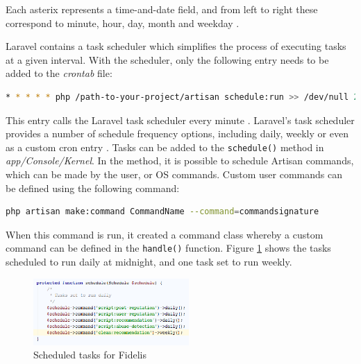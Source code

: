\noindent Each asterix represents a time-and-date field, and from left to right these correspond to minute, hour, day, month and weekday \cite{Ubuntu:Cron}. 

Laravel contains a task scheduler which simplifies the process of executing tasks at a given interval. With the scheduler, only the following entry needs to be added to the \textit{crontab} file:

\begin{lstlisting}[language=bash]
* * * * * php /path-to-your-project/artisan schedule:run >> /dev/null 2>&1
\end{lstlisting}

\noindent This entry calls the Laravel task scheduler every minute \cite{Laravel:Scheduling}. Laravel's task scheduler provides a number of schedule frequency options, including daily, weekly or even as a custom cron entry \cite{Laravel:Scheduling}. Tasks can be added to the \texttt{schedule()} method in \textit{app/Console/Kernel}. In the method, it is possible to schedule Artisan commands, which can be made by the user, or OS commands. Custom user commands can be defined using the following command:

\begin{lstlisting}[language=bash]
php artisan make:command CommandName --command=commandsignature
\end{lstlisting}

When this command is run, it created a command class whereby a custom command can be defined in the \texttt{handle()} function. Figure \ref{fig:FidelisSchedule} shows the tasks scheduled to run daily at midnight, and one task set to run weekly.

\begin{figure}[H]
\centering
\includegraphics[height=1in]{Images/Implementation/FidelisSchedule}
\caption{Scheduled tasks for Fidelis}
\label{fig:FidelisSchedule}
\end{figure}

